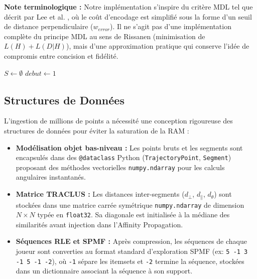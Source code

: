 \documentclass[11pt, a4paper]{article}
\begin{document}
\textbf{Note terminologique :} Notre implémentation s'inspire du critère MDL tel que décrit par Lee et al. \cite{lee2007}, où le coût d'encodage est simplifié sous la forme d'un seuil de distance perpendiculaire ($w_{error}$). Il ne s'agit pas d'une implémentation complète du principe MDL au sens de Rissanen \cite{rissanen1978} (minimisation de $L(H) + L(D|H)$), mais d'une approximation pratique qui conserve l'idée de compromis entre concision et fidélité.

\begin{algorithm}[H]
\DontPrintSemicolon
{}
$S \leftarrow \emptyset$\;
$debut \leftarrow 1$\;
\;
\caption{CompresserTrajectoireMDL}
\end{algorithm}

\subsection{Structures de Données}

L'ingestion de millions de points a nécessité une conception rigoureuse des structures de données pour éviter la saturation de la RAM :

\begin{itemize}
    \item \textbf{Modélisation objet bas-niveau :} Les points bruts et les segments sont encapsulés dans des \texttt{@dataclass} Python (\texttt{TrajectoryPoint}, \texttt{Segment}) proposant des méthodes vectorielles \texttt{numpy.ndarray} pour les calculs angulaires instantanés.
    \item \textbf{Matrice TRACLUS :} Les distances inter-segments ($d_{\perp}$, $d_{\parallel}$, $d_{\theta}$) sont stockées dans une matrice carrée symétrique \texttt{numpy.ndarray} de dimension $N \times N$ typée en \texttt{float32}. Sa diagonale est initialisée à la médiane des similarités avant injection dans l'Affinity Propagation.
    \item \textbf{Séquences RLE et SPMF :} Après compression, les séquences de chaque joueur sont converties au format standard d'exploration SPMF (ex: \texttt{5 -1 3 -1 5 -1 -2}), où \texttt{-1} sépare les itemsets et \texttt{-2} termine la séquence, stockées dans un dictionnaire associant la séquence à son support.
\end{itemize}
\end{document}

